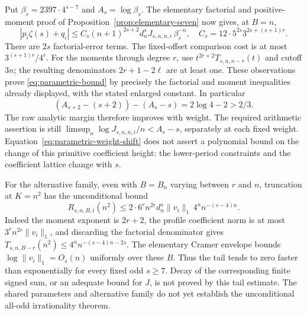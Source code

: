 \documentclass[11pt]{article}
\theoremstyle{remark}
\begin{document}
Put \(\beta_s=2397\cdot4^{s-7}\) and
\(A_s=\log\beta_s\). The elementary factorial and positive-moment proof
of Proposition~\ref{prop:elementary-seven} now gives, at \(B=n\),
\begin{equation}
 |p_i\zeta(s)+q_i|
 \le C_s(n+1)^{2s+2}d_n^sJ_{s,n,n,i}\,\beta_s^{-n},
 \quad C_s=12\cdot5^{2s}3^{2s+(s+1)r}.
 \label{eq:parametric-bound}
\end{equation}
There are \(2s\) factorial-error terms. The fixed-offset comparison
cost is at most \(3^{(s+1)r}/4^r\). For the moments through degree
\(r\), use \(t^{2r+2}T_{s,n,n-r}(t)\) and cutoff \(3n\);
the resulting denominators \(2r+1-2\ell\) are at least one.
These observations prove \eqref{eq:parametric-bound} by precisely the
factorial and moment inequalities already displayed, with the stated
enlarged constant. In particular
\[
 (A_{s+2}-(s+2))-(A_s-s)=2\log4-2>2/3.
\]
The raw analytic margin therefore improves with weight. The required
arithmetic assertion is still
\(\limsup_n\log J_{s,n,n,i}/n<A_s-s\), separately at each fixed weight.
Equation~\eqref{eq:parametric-weight-shift} does not assert a polynomial
bound on the change of this primitive coefficient height: the
lower-period constraints and the coefficient lattice change with \(s\).

For the alternative family, even with \(B=B_n\) varying between \(r\)
and \(n\), truncation at \(K=n^2\) has the unconditional bound
\[
 R_{s,n,B,i}(n^2)\le
 2\cdot6^r n^{2r}d_n^s\|v_i\|_1\,4^n n^{-(s-4)n}.
\]
Indeed the moment exponent is \(2r+2\), the profile coefficient norm
is at most \(3^rn^{2r}\|v_i\|_1\), and discarding the factorial
denominator gives \(T_{s,n,B-r}(n^2)\le4^n n^{-(s-4)n-2s}\).
The elementary Cramer envelope bounds \(\log\|v_i\|_1=O_s(n)\)
uniformly over these \(B\). Thus the tail tends to zero faster than
exponentially for every fixed odd \(s\ge7\). Decay of the corresponding
finite signed sum, or an adequate bound for \(J\), is not proved by
this tail estimate. The shared parameters and alternative family do
not yet establish the unconditional all-odd irrationality theorem.
\end{document}
